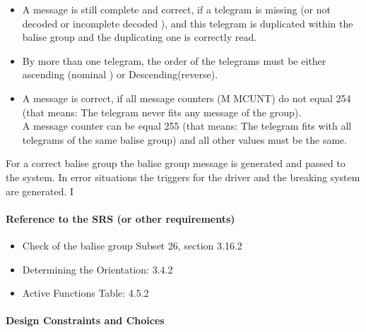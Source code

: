 \documentclass{template/openetcs_report}
\begin{document}
\begin{itemize}
\item A message is still complete and correct, if a telegram is missing (or not decoded or incomplete decoded ), and this telegram is duplicated within the balise group and the duplicating one is correctly read.
\item By more than one telegram, the order of the telegrams must be either ascending (nominal ) or Descending(reverse).\\
\item A message is correct, if  all message counters (M MCUNT) do not equal 254 (that means: The telegram never fits any message of the group).\\ A message counter can be equal 255 (that means: The telegram fits with all telegrams of the same balise group) and all other values must be the same.\\
\end{itemize}

For a correct balise group the balise group message is generated and passed to the system.
In error situations the triggers for the driver and the breaking system are generated.
I
\paragraph{Reference to the SRS (or other requirements)}
\begin{itemize}
\item Check of the balise group Subset 26, section 3.16.2\\
\item Determining the Orientation: 3.4.2\\
\item  Active Functions Table: 4.5.2\\

\end{itemize}

\paragraph{Design Constraints and Choices}
\end{document}
